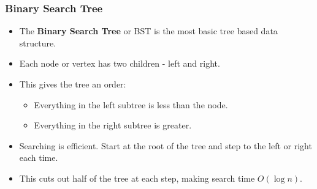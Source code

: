 \documentclass{beamer}
\begin{document}
\begin{frame}
\frametitle{Binary Search Tree}
\begin{itemize}
\item The \textbf{Binary Search Tree} or BST is the most basic tree based data structure.
\item Each node or vertex has two children - left and right.
\item This gives the tree an order:
	\begin{itemize}
	\item Everything in the left subtree is less than the node.
	\item Everything in the right subtree is greater.
	\end{itemize}
\item Searching is efficient. Start at the root of the tree and step to the left or right each time.
\item This cuts out half of the tree at each step, making search time $O(\log n)$.
\end{itemize}
\end{frame}
\end{document}
